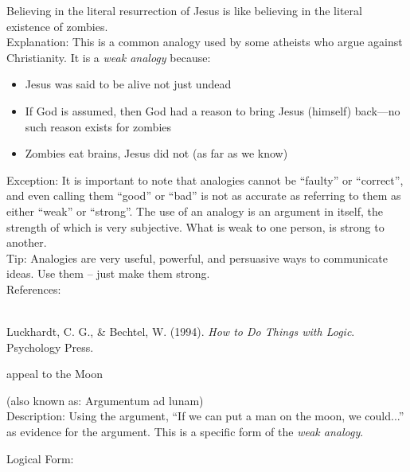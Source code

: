\documentclass[a4paper,12pt,single,pdftex]{scrartcl}
\begin{document}
{    
      Believing in the literal resurrection of Jesus is like believing in the literal existence of zombies.
    \\

    
      Explanation: This is a common analogy used by some atheists who argue against Christianity.  It is a {\it weak analogy} because:
    \\

    \begin{itemize}
  \item 
        Jesus was said to be alive not just undead
      \item 
        If God is assumed, then God had a reason to bring Jesus (himself) back—no such reason exists for zombies
      \item 
        Zombies eat brains, Jesus did not (as far as we know)
      
    \end{itemize}
  
    
      Exception: It is important to note that analogies cannot be “faulty” or “correct”, and even calling them “good” or “bad” is not as accurate as referring to them as either “weak” or “strong”.  The use of an analogy is an argument in itself, the strength of which is very subjective.  What is weak to one person, is strong to another.
    \\

    
      Tip: Analogies are very useful, powerful, and persuasive ways to communicate ideas.  Use them -- just make them strong.
    \\

    References:

    
      
        
      \\

      
        
          Luckhardt, C. G., \& Bechtel, W. (1994). {\it How to Do Things with Logic}. Psychology Press.
        
      
    
  }


appeal to the Moon
    
      (also known as: Argumentum ad lunam)
    \\

  
    Description: Using the argument, “If we can put a man on the moon, we could...” as evidence for the argument. This is a specific form of the {\it weak analogy}.

    
      Logical Form:
    \\
\end{document}
